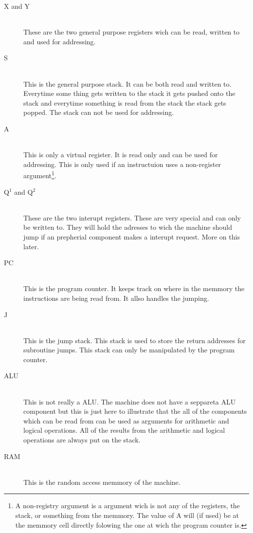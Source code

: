 \documentclass{article}
\begin{document}
\begin{description}
  \item[X and Y] \hfill \\ 
  These are the two general purpose registers wich can be read,
  written to and used for addressing.
  \item[S] \hfill \\
  This is the general purpose stack. It can be both read and
  written to. Everytime some thing gets written to the stack it gets pushed onto the
  stack and everytime something is read from the stack the stack gets popped.
  The stack can not be used for addressing.
  \item[A] \hfill \\
  This is only a virtual register. It is read only and can be used for
  addressing. This is only used if an instructuion uses a non-register
  argument\footnote{A non-registry argument is a argument wich is not any of
  the registers, the stack, or something from the memmory. The value of A will
  (if used) be at the memmory cell directly folowing the one at wich the
  program counter is.}.
  \item[Q$^1$ and Q$^2$] \hfill \\
  These are the two interupt registers. These are very special and can only be
  written to. They will hold the adresses to wich the machine should jump if an
  prepherial component makes a interupt request. More on this later.
  \item[PC]\hfill \\
  This is the program counter. It keeps track on where in the memmory the 
  instructions are being read from. It allso handles the jumping.
  \item[J]\hfill \\
  This is the jump stack. This stack is used to store the return addresses for
  subroutine jumps. This stack can only be manipulated by the program counter.
  \item[ALU]\hfill \\
  This is not really a ALU. The machine does not have a seppareta ALU component
  but this is just here to illustrate that the all of the components which can
  be read from can be used as arguments for arithmetic and logical operations.
  All of the results from the arithmetic and logical operations are always put
  on the stack.
  \item[RAM]\hfill \\
  This is the random access memmory of the machine.
\end{description}
\end{document}
